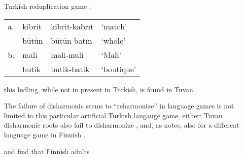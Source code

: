 
\citet{Harrison2001}

\ex Turkish reduplication game \citep[][231]{Harrison2001}: \\
\begin{tabular}{l l l l}
a. & kibrit & kibrit-kabrıt & `match'    \\
   & bütün  & bütün-batın   & `whole'    \\
b. & mali   & mali-muli     & `Mali'     \\
   & butik  & butik-batik   & `boutique' \\
\end{tabular} \xe

this ludling, while not in present in Turkish, is found in Tuvan.

The failure of disharmonic stems to ``reharmonize'' in language games is not limited to this particular artificial Turkish langauge game, either: Tuvan disharmonic roots also fail to disharmonize \citep{Harrison2001}, and, as \citeauthor{Harrison2001} notes, also for a different language game in Finnish \citep{Campbell1986}. 

\citet{Suomi1997} and \citet{Vroomen1998} find that Finnish adults

\citet{Kabak2010} %

\citet{Kampen2008} %

